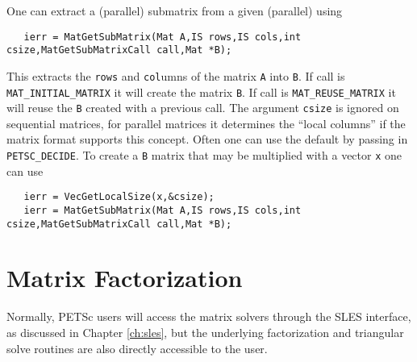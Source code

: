 One can extract a (parallel) submatrix from a given (parallel) using
\begin{verbatim}
   ierr = MatGetSubMatrix(Mat A,IS rows,IS cols,int csize,MatGetSubMatrixCall call,Mat *B);
\end{verbatim}
This extracts the {\tt rows} and {\tt col}umns of the matrix {\tt A} into {\tt B}. If 
call is  {\tt MAT\_INITIAL\_MATRIX}  it will create the matrix
{\tt B}. If call is {\tt MAT\_REUSE\_MATRIX}  it will reuse the {\tt B}
created with a previous call.  The argument {\tt csize} is ignored 
on sequential matrices, for parallel matrices it determines the ``local columns'' if the matrix
format supports this concept. Often one can use the default by passing in {\tt PETSC\_DECIDE}.
To create a {\tt B} matrix that may be multiplied with a vector {\tt x} one can use
\begin{verbatim}
   ierr = VecGetLocalSize(x,&csize);
   ierr = MatGetSubMatrix(Mat A,IS rows,IS cols,int csize,MatGetSubMatrixCall call,Mat *B);
\end{verbatim}


\medskip \medskip

\section{Matrix Factorization} 
\label{sec:matfactor}

Normally, PETSc users will access the matrix solvers through the 
SLES interface, as discussed in Chapter \ref{ch:sles}, but the underlying 
factorization and triangular solve routines are also directly 
accessible to the user.

\medskip \medskip


